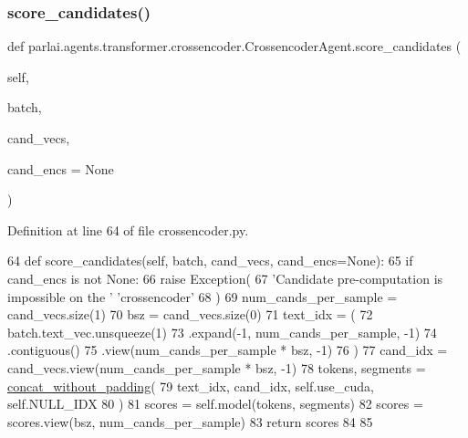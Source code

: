 \subsubsection{\texorpdfstring{score\+\_\+candidates()}{score\_candidates()}}
{\footnotesize\ttfamily def parlai.\+agents.\+transformer.\+crossencoder.\+Crossencoder\+Agent.\+score\+\_\+candidates (\begin{DoxyParamCaption}\item[{}]{self,  }\item[{}]{batch,  }\item[{}]{cand\+\_\+vecs,  }\item[{}]{cand\+\_\+encs = {\ttfamily None} }\end{DoxyParamCaption})}



Definition at line 64 of file crossencoder.\+py.


\begin{DoxyCode}
64     \textcolor{keyword}{def }score\_candidates(self, batch, cand\_vecs, cand\_encs=None):
65         \textcolor{keywordflow}{if} cand\_encs \textcolor{keywordflow}{is} \textcolor{keywordflow}{not} \textcolor{keywordtype}{None}:
66             \textcolor{keywordflow}{raise} Exception(
67                 \textcolor{stringliteral}{'Candidate pre-computation is impossible on the '} \textcolor{stringliteral}{'crossencoder'}
68             )
69         num\_cands\_per\_sample = cand\_vecs.size(1)
70         bsz = cand\_vecs.size(0)
71         text\_idx = (
72             batch.text\_vec.unsqueeze(1)
73             .expand(-1, num\_cands\_per\_sample, -1)
74             .contiguous()
75             .view(num\_cands\_per\_sample * bsz, -1)
76         )
77         cand\_idx = cand\_vecs.view(num\_cands\_per\_sample * bsz, -1)
78         tokens, segments = \hyperlink{namespaceparlai_1_1agents_1_1bert__ranker_1_1cross__encoder__ranker_a3914765cd62574f6f077c6e2e0070ab4}{concat\_without\_padding}(
79             text\_idx, cand\_idx, self.use\_cuda, self.NULL\_IDX
80         )
81         scores = self.model(tokens, segments)
82         scores = scores.view(bsz, num\_cands\_per\_sample)
83         \textcolor{keywordflow}{return} scores
84 
85 
\end{DoxyCode}
\mbox{\label{classparlai_1_1agents_1_1transformer_1_1crossencoder_1_1CrossencoderAgent_a736057f000f0d4cdb5d006e10c4291db}} 
